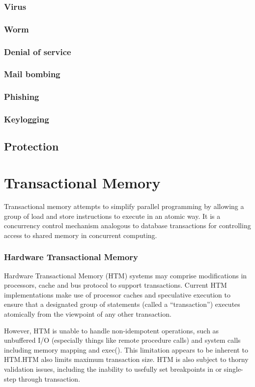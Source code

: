 \documentclass[a4paper,oneside]{report}
\begin{document}
    	\subsection{Virus}
    	\subsection{Worm}
    	\subsection{Denial of service}
    	\subsection{Mail bombing}
    	\subsection{Phishing}
    	\subsection{Keylogging}
  	\section{Protection}
  	
  	\chapter{Transactional Memory}
  	
  	Transactional memory attempts to simplify parallel programming by allowing a group of load and store instructions to execute in an atomic way. It is a concurrency control mechanism analogous to database transactions for controlling access to shared memory in concurrent computing.
  	
  	\subsection{Hardware Transactional Memory}
  	Hardware Transactional Memory (HTM) systems may comprise modifications in processors, cache and bus protocol to support transactions. Current HTM implementations make use of processor caches and speculative execution to ensure that a designated group of statements (called a “transaction”) executes atomically from the viewpoint of any other transaction. 

However, HTM is unable to handle non-idempotent operations, such as unbuffered I/O (especially things like remote procedure calls) and system calls including memory mapping and exec(). This limitation appears to be inherent to HTM.HTM also limits maximum transaction size. HTM is also subject to thorny validation issues, including the inability to usefully set breakpoints in or single-step through transaction. 
\end{document}
